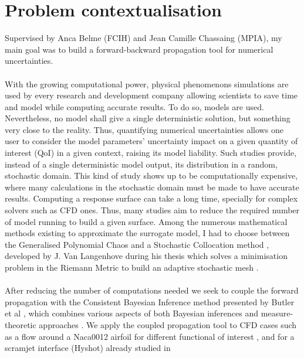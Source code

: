 \documentclass[11pt, a4paper, English]{report}
\begin{document}
\section*{Problem contextualisation}
Supervised by Anca Belme (FCIH) and Jean Camille Chassaing (MPIA), my main goal was to build a forward-backward propagation tool for numerical uncertainties. \\\\
With the growing computational power, physical phenomenons simulations are used by every research and development company allowing scientists to save time and model while computing accurate results. To do so, models are used. Nevertheless, no model shall give a single deterministic solution, but something very close to the reality. Thus, quantifying numerical uncertainties allows one user to consider the model parameters' uncertainty impact on a given quantity of interest (QoI) in a given context, raising its model liability. Such studies provide, instead of a single deterministic model output, its distribution in a random, stochastic domain. This kind of study shows up to be computationally expensive, where many calculations in the stochastic domain must be made to have accurate results. Computing a response surface can take a long time, specially for complex solvers such as CFD ones. Thus, many studies aim to reduce the required number of model running to build a given surface. Among the numerous mathematical methods existing to approximate the surrogate model, I had to choose between the Generalised Polynomial Chaos \cite{xiu} and a Stochastic Collocation method \cite{NasaSCM}, developed by J. Van Langenhove during his thesis \cite{Janthesis} which solves a minimisation problem in the Riemann Metric to build an adaptive stochastic mesh \cite{Loseille}\cite{Loseillemesh}. \\\\
After reducing the number of computations needed we seek to couple the forward propagation with the Consistent Bayesian Inference method presented by Butler et al \cite{Tim2}, which combines various aspects of both Bayesian inferences \cite{RSampling} and measure-theoretic approaches \cite{Tim1}. We apply the coupled propagation tool to CFD cases such as a flow around a Naca0012 airfoil for different functional of interest \cite{JC}, and for a scramjet interface (Hyshot) already studied in 


\color{blue!0.4!black}\tableofcontents

\newpage
\listoffigures
\end{document}
